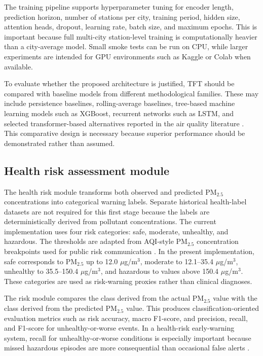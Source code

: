 \documentclass[pdflatex,sn-mathphys-num]{sn-jnl}
\begin{document}
The training pipeline supports hyperparameter tuning for encoder length, prediction horizon, number of stations per city, training period, hidden size, attention heads, dropout, learning rate, batch size, and maximum epochs. This is important because full multi-city station-level training is computationally heavier than a city-average model. Small smoke tests can be run on CPU, while larger experiments are intended for GPU environments such as Kaggle or Colab when available.

To evaluate whether the proposed architecture is justified, TFT should be compared with baseline models from different methodological families. These may include persistence baselines, rolling-average baselines, tree-based machine learning models such as XGBoost, recurrent networks such as LSTM, and selected transformer-based alternatives reported in the air quality literature \cite{jiao2022automated,cui2023sparse,wang2023msaformer,hu2024feddeep}. This comparative design is necessary because superior performance should be demonstrated rather than assumed.

\subsection{Health risk assessment module}\label{subsec:health_module}

The health risk module transforms both observed and predicted PM$_{2.5}$ concentrations into categorical warning labels. Separate historical health-label datasets are not required for this first stage because the labels are deterministically derived from pollutant concentrations. The current implementation uses four risk categories: safe, moderate, unhealthy, and hazardous. The thresholds are adapted from AQI-style PM$_{2.5}$ concentration breakpoints used for public risk communication \cite{airnow2026aqi,epa2026breakpoints}. In the present implementation, safe corresponds to PM$_{2.5}$ up to 12.0 $\mu$g/m$^3$, moderate to 12.1--35.4 $\mu$g/m$^3$, unhealthy to 35.5--150.4 $\mu$g/m$^3$, and hazardous to values above 150.4 $\mu$g/m$^3$. These categories are used as risk-warning proxies rather than clinical diagnoses.

The risk module compares the class derived from the actual PM$_{2.5}$ value with the class derived from the predicted PM$_{2.5}$ value. This produces classification-oriented evaluation metrics such as risk accuracy, macro F1-score, and precision, recall, and F1-score for unhealthy-or-worse events. In a health-risk early-warning system, recall for unhealthy-or-worse conditions is especially important because missed hazardous episodes are more consequential than occasional false alerts \cite{muratuly2025health,johnson2025agent}.
\end{document}
